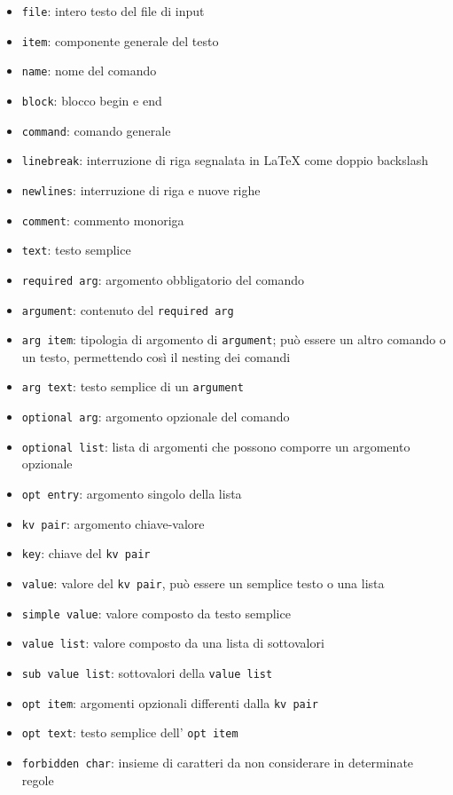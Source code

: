 \documentclass{article}
\begin{document}
    \begin{itemize}
        \item \texttt{file}: intero testo del file di input
        \item \texttt{item}: componente generale del testo
        \item \texttt{name}: nome del comando
        \item \texttt{block}: blocco begin e end
        \item \texttt{command}: comando generale
        \item \texttt{linebreak}: interruzione di riga segnalata in LaTeX come doppio backslash
        \item \texttt{newlines}: interruzione di riga e nuove righe
        \item \texttt{comment}: commento monoriga
        \item \texttt{text}: testo semplice
        \item \texttt{required arg}: argomento obbligatorio del comando
        \item \texttt{argument}: contenuto del \texttt{required arg}
        \item \texttt{arg item}: tipologia di argomento di \texttt{argument}; può essere un altro comando o un testo, permettendo così il nesting dei comandi
        \item \texttt{arg text}: testo semplice di un \texttt{argument}
        \item \texttt{optional arg}: argomento opzionale del comando
        \item \texttt{optional list}: lista di argomenti che possono comporre un argomento opzionale
        \item \texttt{opt entry}: argomento singolo della lista
        \item \texttt{kv pair}: argomento chiave-valore
        \item \texttt{key}: chiave del \texttt{kv pair}
        \item \texttt{value}: valore del \texttt{kv pair}, può essere un semplice testo o una lista
        \item \texttt{simple value}: valore composto da testo semplice
        \item \texttt{value list}: valore composto da una lista di sottovalori
        \item \texttt{sub value list}: sottovalori della \texttt{value list}
        \item \texttt{opt item}: argomenti opzionali differenti dalla \texttt{kv pair}
        \item \texttt{opt text}: testo semplice dell' \texttt{opt item}
        \item \texttt{forbidden char}: insieme di caratteri da non considerare in determinate regole
    \end{itemize}
\end{document}
